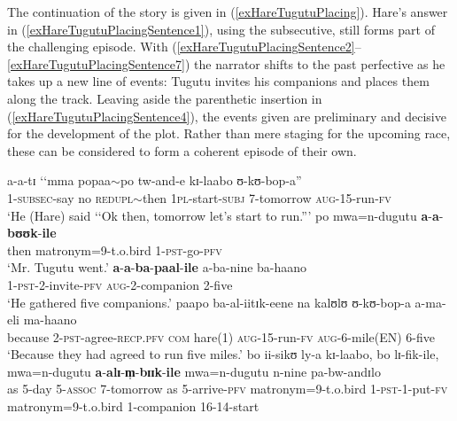   
The continuation of the story is given in (\ref{exHareTugutuPlacing}). Hare's answer in (\ref{exHareTugutuPlacingSentence1}), using the subsecutive, still forms part of the challenging episode. With (\ref{exHareTugutuPlacingSentence2}--\ref{exHareTugutuPlacingSentence7}) the narrator shifts to the past perfective as he takes up a new line of events: Tugutu invites his companions and places them along the track. Leaving aside the parenthetic insertion in (\ref{exHareTugutuPlacingSentence4}), the events given are preliminary and decisive for the development of the plot. Rather than mere staging for the upcoming race, these can be considered to form a coherent episode of their own. 
\largerpage
\begin{exe}
\ex \label{exHareTugutuPlacing}\begin{xlist}
\ex \label{exHareTugutuPlacingSentence1}\gll a-a-tɪ \textup{\lq\lq}mma popaa$\sim$po tw-and-e kɪ-laabo ʊ-kʊ-bop-a\textup{''}\\
1-\textsc{subsec}-say \phantom{\lq\lq}no \textsc{redupl}$\sim$then \textsc{1pl}-start-\textsc{subj} 7-tomorrow \textsc{aug}-15-run-\textsc{fv}\\
\glt \lq He (Hare) said \lq\lq Ok then, tomorrow let's start to run.''{}'
\ex \label{exHareTugutuPlacingSentence2} \gll po mwa=n-dugutu \textbf{a}-\textbf{a}-\textbf{bʊʊk}-\textbf{ile}\\
then matronym=9-t.o.bird 1-\textsc{pst}-go-\textsc{pfv}\\
\glt \lq Mr. Tugutu went.'
\ex\label{exHareTugutuPlacingSentence3} \gll \textbf{a}-\textbf{a}-\textbf{ba}-\textbf{paal}-\textbf{ile} a-ba-nine ba-haano\\
1-\textsc{pst}-2-invite-\textsc{pfv} \textsc{aug}-2-companion 2-five\\
\glt \lq He gathered five companions.'
\ex\label{exHareTugutuPlacingSentence4} \gll paapo ba-al-iitɪk-eene na kalʊlʊ ʊ-kʊ-bop-a a-ma-eli ma-haano\\
because 2-\textsc{pst}-agree-\textsc{recp.pfv} \textsc{com} hare(1) \textsc{aug}-15-run-\textsc{fv} \textsc{aug}-6-mile(EN) 6-five\\
\glt \lq Because they had agreed to run five miles.'
\ex\label{exHareTugutuPlacingSentence5} \gll bo ii-sikʊ ly-a kɪ-laabo, bo lɪ-fik-ile, mwa=n-dugutu \textbf{a}-\textbf{alɪ}-\textbf{m̩}-\textbf{bɪɪk}-\textbf{ile} mwa=n-dugutu n-nine pa-bw-andɪlo\\
as 5-day 5-\textsc{assoc} 7-tomorrow as 5-arrive-\textsc{pfv} matronym=9-t.o.bird 1-\textsc{pst}-1-put-\textsc{fv} matronym=9-t.o.bird 1-companion 16-14-start\\

\end{xlist}
\end{exe}
